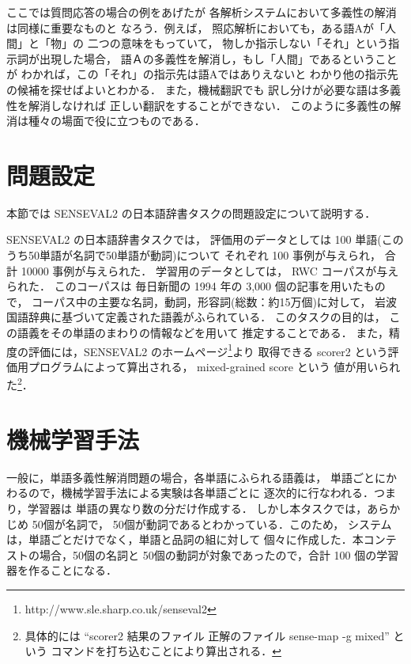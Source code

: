 ここでは質問応答の場合の例をあげたが
各解析システムにおいて多義性の解消は同様に重要なものと
なろう．例えば，
照応解析\cite{murata_deno_nlp}においても，ある語Aが「人間」と「物」の
二つの意味をもっていて，
物しか指示しない「それ」という指示詞が出現した場合，
語Ａの多義性を解消し，もし「人間」であるということが
わかれば，この「それ」の指示先は語Aではありえないと
わかり他の指示先の候補を探せばよいとわかる．
また，機械翻訳でも
訳し分けが必要な語は多義性を解消しなければ
正しい翻訳をすることができない．
このように多義性の解消は種々の場面で役に立つものである．

\section{問題設定}
\label{sec:mondai_settei}

本節では SENSEVAL2 の日本語辞書タスクの問題設定について説明する．

SENSEVAL2 の日本語辞書タスクでは，
評価用のデータとしては
100 単語(このうち50単語が名詞で50単語が動詞)について
それぞれ 100 事例が与えられ，
合計 10000 事例が与えられた．
学習用のデータとしては，
RWC コーパス\cite{shirai_nl2001}が与えられた．
このコーパスは
毎日新聞の 1994 年の 3,000 個の記事を用いたもので，
コーパス中の主要な名詞，動詞，形容詞(総数：約15万個)に対して，
岩波国語辞典に基づいて定義された語義がふられている．
このタスクの目的は，
この語義をその単語のまわりの情報などを用いて
推定することである．
また，精度の評価には，SENSEVAL2 のホームページ\footnote{http://www.sle.sharp.co.uk/senseval2}より
取得できる scorer2 
という評価用プログラムによって算出される， mixed-grained score という
値が用いられた\footnote{具体的には ``scorer2 結果のファイル 正解のファイル sense-map -g mixed'' という
コマンドを打ち込むことにより算出される．}．

\section{機械学習手法}
\label{sec:ml_method}

一般に，単語多義性解消問題の場合，各単語にふられる語義は，
単語ごとにかわるので，機械学習手法による実験は各単語ごとに
逐次的に行なわれる．つまり，学習器は
単語の異なり数の分だけ作成する．
しかし本タスクでは，あらかじめ 50個が名詞で，
 50個が動詞であるとわかっている．このため，
システムは，単語ごとだけでなく，単語と品詞の組に対して
個々に作成した．本コンテストの場合，50個の名詞と
50個の動詞が対象であったので，合計 100 個の学習器を作ることになる．

